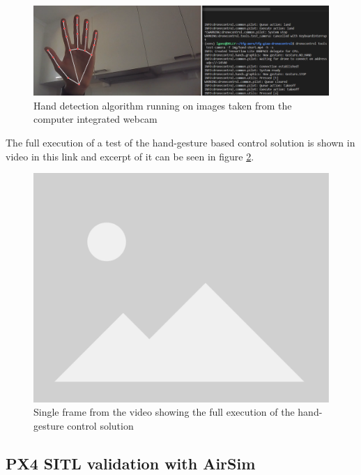 \begin{figure}
  \centering
  \includegraphics[width=\textwidth, keepaspectratio]{img/sitl-hand-2.png}
  \caption{Hand detection algorithm running on images taken from the computer integrated webcam}\label{fig:sitl-hand}
\end{figure}

The full execution of a test of the hand-gesture based control solution is shown in video in this link and excerpt of it can be seen in figure \ref{fig:sitl-hand-video}.

\begin{figure}
  \centering
  \includegraphics[width=.6\textwidth, keepaspectratio]{img/placeholder.png}
  \caption{Single frame from the video showing the full execution of the hand-gesture control solution}
  \label{fig:sitl-hand-video}
\end{figure}


\subsection{PX4 SITL validation with AirSim}
\label{sec:test-3-airsim}

